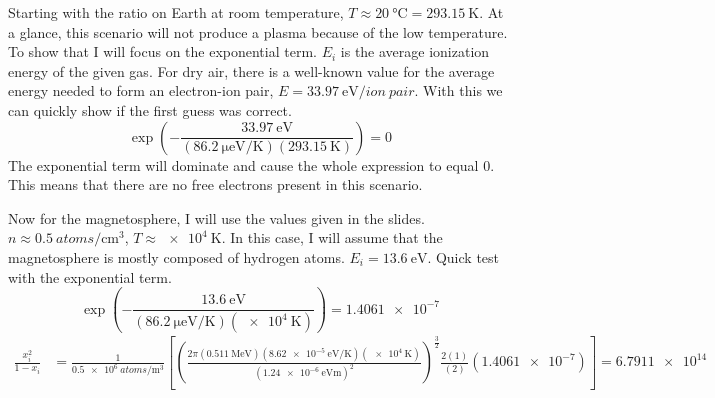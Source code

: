 \documentclass{article}
\begin{document}
	\clearpage
		
		Starting with the ratio on Earth at room temperature, $T \approx \qty{20}{\degreeCelsius} = \qty{293.15}{\kelvin}$. At a glance, this scenario will not produce a plasma because of the low temperature. To show that I will focus on the exponential term. $E_i$ is the average ionization energy of the given gas. For dry air, there is a well-known value for the average energy needed to form an electron-ion pair, $E = \qty{33.97}{\electronvolt\per ion \ pair}$. With this we can quickly show if the first guess was correct.
		\[
			\exp\left( -\frac{\qty{33.97}{\electronvolt}}{(\qty{86.2}{\micro\electronvolt\per\kelvin})(\qty{293.15}{\kelvin})} \right) = 0
		\]
		The exponential term will dominate and cause the whole expression to equal $0$. This means that there are no free electrons present in this scenario. \\
		\par
		\noindent Now for the magnetosphere, I will use the values given in the slides. $n \approx \qty{0.5}{atoms\per\centi\meter\cubed}$, $T \approx \qty{e4}{\kelvin}$. In this case, I will assume that the magnetosphere is mostly composed of hydrogen atoms. $E_i = \qty{13.6}{\electronvolt}$. Quick test with the exponential term.
		\[
			\exp\left( -\frac{\qty{13.6}{\electronvolt}}{(\qty{86.2}{\micro\electronvolt\per\kelvin})(\qty{e4}{\kelvin})} \right) = \num{1.4061e-7}
		\]
		\begin{equation*}
			\begin{split}
				\frac{x^2_i}{1 - x_i} &= \frac{1}{\qty{0.5e6}{atoms\per\meter\cubed}} \left[ \left( \frac{2\pi (\qty{0.511}{\mega\electronvolt})(\qty{8.62e-5}{\electronvolt\per\kelvin})(\qty{e4}{\kelvin})}{(\qty{1.24e-6}{\electronvolt\meter})^2} \right)^\frac{3}{2} \frac{2(1)}{(2)} (\num{1.4061e-7}) \right] = \num{6.7911e14} \\
			\end{split}
		\end{equation*}
\end{document}
